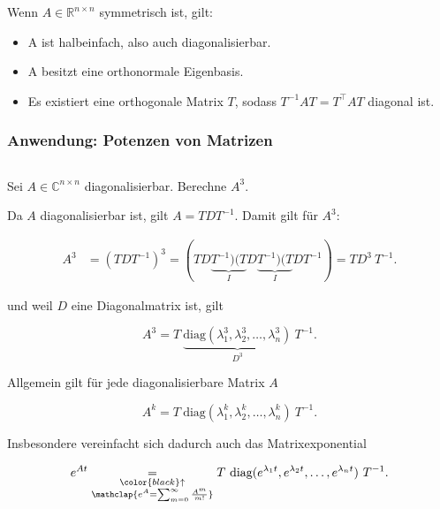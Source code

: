 \vspace{0.5\baselineskip}

Wenn \( A \in \mathbb{R}^{n \times n} \)  symmetrisch ist, gilt:

\begin{itemize}
    \item A ist halbeinfach, also auch diagonalisierbar.
    \item A besitzt eine orthonormale Eigenbasis.
    \item Es existiert eine orthogonale Matrix \( T \), sodass \( T^{-1} A T = T^\top A T \) diagonal ist.
\end{itemize}

\subsubsection{Anwendung: Potenzen von Matrizen} \( \ \)

\vspace{0.5\baselineskip}

Sei \( A \in \mathbb{C}^{n \times n} \) diagonalisierbar. Berechne \( A^3 \). 

\vspace{1\baselineskip}

Da \( A \) diagonalisierbar ist, gilt \( A = T D T^{-1} \). Damit gilt für \( A^3 \):

\begin{equation*}
    \begin{aligned}
        A^3 &= (T D T^{-1})^3 = (T D \underbrace{T^{-1}) (T}_{I} D \underbrace{T^{-1}) (T}_{I} D T^{-1}) = T D^3 \ T^{-1}.
    \end{aligned}
\end{equation*} 

und weil \( D \) eine Diagonalmatrix ist, gilt

\begin{equation*}
    A^3 = T \ \underbrace{ \text{diag}(\lambda_1^3, \lambda_2^3, \dots, \lambda_n^3)}_{D^3} \ T^{-1}.
\end{equation*}

Allgemein gilt für jede diagonalisierbare Matrix \( A \)

\begin{equation*}
    A^k = T \ \text{diag}(\lambda_1^k, \lambda_2^k, \dots, \lambda_n^k) \ T^{-1}.
\end{equation*}

Insbesondere vereinfacht sich dadurch auch das Matrixexponential

\begin{equation*}
    e^{At} \underset{\substack{\color{black}\uparrow \\
                       \mathclap{e^A = \sum_{m=0}^{\infty} \frac{A^m}{m!}}}}{=}T \ \text{diag}(e^{\lambda_1 t}, e^{\lambda_2 t}, \dots, e^{\lambda_n t}) \ T^{-1}.
\end{equation*}
